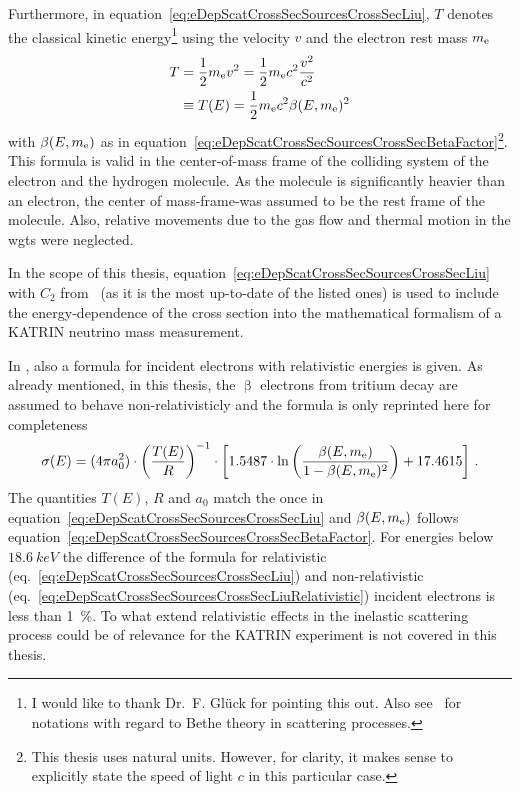 Furthermore, in equation~\eqref{eq:eDepScatCrossSecSourcesCrossSecLiu}, $T$ denotes the classical kinetic energy\footnote{I would like to thank Dr.~F. Glück for pointing this out. Also see~\cite{INOKUTI1971} for notations with regard to Bethe theory in scattering processes.} using the velocity $v$ and the electron rest mass $m_{\mathrm{e}}$
\begin{align}
	\label{eq:eDepScatCrossSecSourcesCrossSecNonRelEnergy}
	T  &= \frac{1}{2} m_{\mathrm{e}} v^2 = 
	\frac{1}{2} m_{\mathrm{e}}  c^2  \frac{v^2}{c^2} \nonumber \\
	&\equiv T(E) = \frac{1}{2} m_{\mathrm{e}}  c^2  \beta(E, m_{\mathrm{e}})^2
\end{align}
with $\beta(E, m_{\mathrm{e}})$ as in equation~\eqref{eq:eDepScatCrossSecSourcesCrossSecBetaFactor}\footnote{This thesis uses natural units. However, for clarity, it makes sense to explicitly state the speed of light $c$ in this particular case.}. This formula is valid in the center-of-mass frame of the colliding system of the electron and the hydrogen molecule. As the molecule is significantly heavier than an electron, the center of mass-frame-was assumed to be the rest frame of the molecule. Also, relative movements due to the gas flow and thermal motion in the \gls{wgts} were neglected.

In the scope of this thesis, equation~\eqref{eq:eDepScatCrossSecSourcesCrossSecLiu} with $C_2$ from~\cite{Liu1987} (as it is the most up-to-date of the listed ones) is used to include the energy-dependence of the cross section into the mathematical formalism of a KATRIN neutrino mass measurement.

In \cite{Liu1973}, also a formula for incident electrons with relativistic energies is given. As already mentioned, in this thesis, the $\upbeta$ electrons from tritium decay are assumed to behave non-relativisticly and the formula is only reprinted here for completeness
\begin{equation}
	\label{eq:eDepScatCrossSecSourcesCrossSecLiuRelativistic}
	\sigma(E) =  
	(4 \pi a_0^2) \cdot
	\left(\frac{T(E)}{R}\right)^{-1} \cdot
	\left[
	1.5487 \cdot \ln{\left(\frac{\beta(E,m_{\mathrm{e}})}{1-\beta(E,m_{\mathrm{e}})^2}\right)} + 17.4615
	\right]
	\text{\,.}
\end{equation}
The quantities $T(E)$, $R$ and $a_0$ match the once in equation~\eqref{eq:eDepScatCrossSecSourcesCrossSecLiu} and $\beta(E, m_{\mathrm{e}})$ follows equation~\eqref{eq:eDepScatCrossSecSourcesCrossSecBetaFactor}. For energies below $\SI{18.6}{keV}$ the difference of the formula for relativistic (eq.~\ref{eq:eDepScatCrossSecSourcesCrossSecLiu}) and non-relativistic (eq.~\ref{eq:eDepScatCrossSecSourcesCrossSecLiuRelativistic}) incident electrons is less than \SI{1}{\percent}. To what extend relativistic effects in the inelastic scattering process could be of relevance for the KATRIN experiment is not covered in this thesis.

